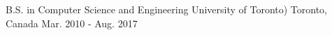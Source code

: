 

\begin{cventries}

	\cventry
		{B.S. in Computer Science and Engineering} %
		{University of Toronto)} %
		{Toronto, Canada} %
		{Mar. 2010 - Aug. 2017} %
		{
			\begin{cvitems} %
			\end{cvitems}
		}

\end{cventries}
